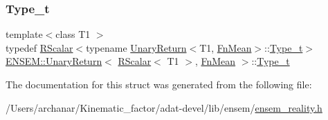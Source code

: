 \mbox{\label{structENSEM_1_1UnaryReturn_3_01RScalar_3_01T1_01_4_00_01FnMean_01_4_a16f842b2df05b5909c08ddde22ca69f8}} 
\subsubsection{\texorpdfstring{Type\_t}{Type\_t}\hspace{0.1cm}{\footnotesize\ttfamily [3/3]}}
{\footnotesize\ttfamily template$<$class T1 $>$ \\
typedef \mbox{\hyperlink{classENSEM_1_1RScalar}{R\+Scalar}}$<$typename \mbox{\hyperlink{structENSEM_1_1UnaryReturn}{Unary\+Return}}$<$T1, \mbox{\hyperlink{structENSEM_1_1FnMean}{Fn\+Mean}}$>$\+::\mbox{\hyperlink{structENSEM_1_1UnaryReturn_3_01RScalar_3_01T1_01_4_00_01FnMean_01_4_a16f842b2df05b5909c08ddde22ca69f8}{Type\+\_\+t}}$>$ \mbox{\hyperlink{structENSEM_1_1UnaryReturn}{E\+N\+S\+E\+M\+::\+Unary\+Return}}$<$ \mbox{\hyperlink{classENSEM_1_1RScalar}{R\+Scalar}}$<$ T1 $>$, \mbox{\hyperlink{structENSEM_1_1FnMean}{Fn\+Mean}} $>$\+::\mbox{\hyperlink{structENSEM_1_1UnaryReturn_3_01RScalar_3_01T1_01_4_00_01FnMean_01_4_a16f842b2df05b5909c08ddde22ca69f8}{Type\+\_\+t}}}



The documentation for this struct was generated from the following file\+:\begin{DoxyCompactItemize}
\item 
/\+Users/archanar/\+Kinematic\+\_\+factor/adat-\/devel/lib/ensem/\mbox{\hyperlink{adat-devel_2lib_2ensem_2ensem__reality_8h}{ensem\+\_\+reality.\+h}}\end{DoxyCompactItemize}
